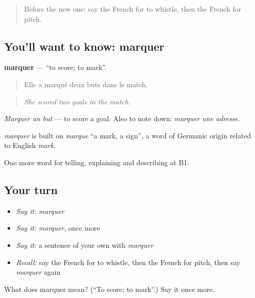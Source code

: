 \label{lesson:FR-C505-marquer}



\begin{quote}
Before the new one: say the French for to whistle, then the French for pitch.
\end{quote}

\subsection*{You'll want to know: marquer}
\textbf{marquer} — \textquotedblleft{}to score; to mark\textquotedblright{}.

\begin{quote}
Elle a marqué deux buts dans le match.
\end{quote}

\begin{quote}
\emph{She scored two goals in the match.}
\end{quote}

\emph{Marquer un but} — to score a goal. Also to note down: \emph{marquer une adresse}.

\begin{cousinweb}
\emph{marquer} is built on \emph{marque} \textquotedblleft{}a mark, a sign\textquotedblright{}, a word of Germanic origin related to English \emph{mark}.
\end{cousinweb}

\begin{grammarlens}[title={What you've built}]
One more word for telling, explaining and describing at B1.
\end{grammarlens}

\subsection*{Your turn}
\begin{itemize}
\raggedright
  \item \emph{Say it:} \emph{marquer}
  \item \emph{Say it:} \emph{marquer}, once more
  \item \emph{Say it:} a sentence of your own with \emph{marquer}
  \item \emph{Recall:} say the French for to whistle, then the French for pitch, then say \emph{marquer} again
\end{itemize}

\begin{tcolorbox}[breakable,colback=teal!4,colframe=teal!35!black,title={Before you move on}]
What does marquer mean? (\textquotedblleft{}To score; to mark\textquotedblright{}.) Say it once more.
\end{tcolorbox}
